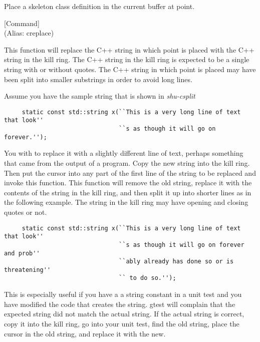 \begin{doc-string}
Place a skeleton class definition in the current buffer at point.
\end{doc-string}

\vspace{1em}
\noindent
{}
\usebox{\funcname}
 \hfill [Command]\\%
 (Alias: creplace)

\begin{doc-string}
This function will replace the C++ string in which point is placed with the
C++ string in the kill ring.  The C++ string in the kill ring is expected to be
a single string with or without quotes.  The C++ string in which point is placed
may have been split into smaller substrings in order to avoid long lines.

Assume you have the sample string that is shown in \emph{shu-csplit}

\small{\begin{verbatim}
     static const std::string x(``This is a very long line of text that look''
                                ``s as though it will go on forever.'');
\end{verbatim}}

You with to replace it with a slightly different line of text, perhaps something
that came from the output of a program.  Copy the new string into the kill ring.
Then put the cursor into any part of the first line of the string to be replaced
and invoke this function.  This function will remove the old string, replace it
with the contents of the string in the kill ring, and then split it up into
shorter lines as in the following example.  The string in the kill ring may have
opening and closing quotes or not.

\small{\begin{verbatim}
     static const std::string x(``This is a very long line of text that look''
                                ``s as though it will go on forever and prob''
                                ``ably already has done so or is threatening''
                                `` to do so.'');
\end{verbatim}}

This is especially useful if you have a a string constant in a unit test and you
have modified the code that creates the string.  gtest will complain that the
expected string did not match the actual string.  If the actual string is
correct, copy it into the kill ring, go into your unit test, find the old
string, place the cursor in the old string, and replace it with the new.
\end{doc-string}

